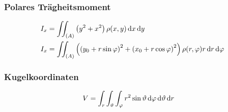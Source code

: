 \subsubsection*{Polares Trägheitsmoment}
\begin{align*}
I_x&=\iint_{(A)}\left(y^2+x^2\right)\rho(x,y)\mathop{}\!\mathrm{d} x\mathop{}\!\mathrm{d} y\\
I_x&=\iint_{(A)}\left(\left(y_0+r\sin\varphi\right)^2+\left(x_0+r\cos\varphi\right)^2\right)\rho(r,\varphi)r\mathop{}\!\mathrm{d} r\mathop{}\!\mathrm{d} \varphi
\end{align*}

\subsubsection*{Kugelkoordinaten}
\begin{align*}
V&=\int_r\int_\vartheta\int_\varphi r^2\sin\vartheta\mathop{}\!\mathrm{d} \varphi \mathop{}\!\mathrm{d} \vartheta \mathop{}\!\mathrm{d} r
\end{align*}